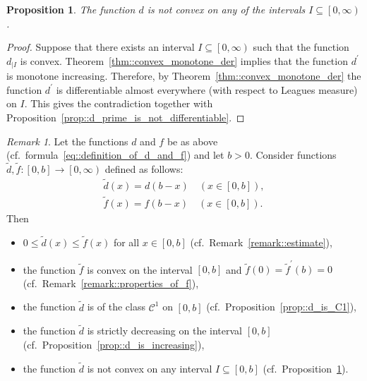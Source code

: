 \documentclass[12pt]{article}
\renewcommand{\leq}{\leqslant}
\newcommand{\ContClass}{\mathcal{C}}
\newcommand{\paren}[1]{\! \left(#1 \right)}
\newcommand{\bracket}[1]{\! \left[#1 \right]}
\theoremstyle{plain}
\newtheorem{proposition}[theorem]{Proposition}
\theoremstyle{definition}
\theoremstyle{remark}
\newtheorem{remark}[theorem]{Remark}
\begin{document}
\begin{proposition} \label{d_is_non_convex_on_any_interval}
    The function $d$ is not convex on any of the intervals $I \subseteq \left[0, \infty \right)$.
\end{proposition}
\begin{proof}
    Suppose that there exists an interval $I \subseteq \left[0, \infty \right)$ such that the function $d_{|I}$ is convex.
    Theorem~\ref{thm::convex_monotone_der} implies that the function $d^\prime$ is monotone increasing.
    Therefore, by Theorem~\ref{thm::convex_monotone_der} the function $d^\prime$ is differentiable almost everywhere (with respect to Leagues measure) on $I$.
    This gives the contradiction together with Proposition~\ref{prop::d_prime_is_not_differentiable}.
\end{proof}

\begin{remark}
    Let the functions $d$ and $f$ be as above (cf.\ formula~\eqref{eq::definition_of_d_and_f}) and let $b>0$.
    Consider functions $\widetilde{d}, \widetilde{f} \colon \bracket{0, b} \to \left[0, \infty \right)$ defined as follows:
    \begin{align*}
        \widetilde{d}\paren{x} = d\paren{b-x} \quad \paren{x \in \bracket{0, b}}, \\
        \widetilde{f}\paren{x} = f\paren{b-x} \quad \paren{x \in \bracket{0, b}}.
    \end{align*}
    Then
    \begin{itemize}
        \item $0 \leq \widetilde{d}\paren{x} \leq \widetilde{f}\paren{x}$ for all $x \in \bracket{0, b}$ (cf.\ Remark~\ref{remark::estimate}),
        \item the function $\widetilde{f}$ is convex on the interval $\bracket{0, b}$ and $\widetilde{f}\paren{0} = \widetilde{f}^\prime\paren{b} = 0$ (cf.\ Remark~\ref{remark::properties_of_f}),
        \item the function $\widetilde{d}$ is of the class $\ContClass^1$ on $\bracket{0, b}$ (cf.\ Proposition~\ref{prop::d_is_C1}),
        \item the function $\widetilde{d}$ is strictly decreasing on the interval $\bracket{0, b}$ (cf.\ Proposition~\ref{prop::d_is_increasing}),
        \item the function $\widetilde{d}$ is not convex on any interval $I \subseteq \bracket{0, b}$ (cf.\ Proposition~\ref{d_is_non_convex_on_any_interval}).
    \end{itemize} 
\end{remark}

{}

\end{document}
